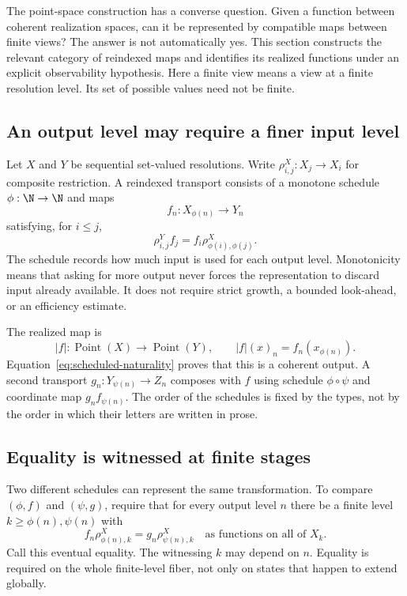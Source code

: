 \label{sec:observation}
The point-space construction has a converse question. Given a function between coherent realization spaces, can it be represented by compatible maps between finite views? The answer is not automatically yes. This section constructs the relevant category of reindexed maps and identifies its realized functions under an explicit observability hypothesis. Here a finite view means a view at a finite resolution level. Its set of possible values need not be finite.

\subsection{An output level may require a finer input level}
Let \(X\) and \(Y\) be sequential set-valued resolutions. Write \(\rho^X_{i,j}:X_j\to X_i\) for composite restriction. A reindexed transport consists of a monotone schedule \(\phi:\N\to\N\) and maps
\[
 f_n:X_{\phi(n)}\longrightarrow Y_n
\]
satisfying, for \(i\le j\),
\begin{equation}\label{eq:scheduled-naturality}
 \rho^Y_{i,j}f_j=f_i\rho^X_{\phi(i),\phi(j)}.
\end{equation}
The schedule records how much input is used for each output level. Monotonicity means that asking for more output never forces the representation to discard input already available. It does not require strict growth, a bounded look-ahead, or an efficiency estimate.

The realized map is
\[
 |f|:\operatorname{Point}(X)\to\operatorname{Point}(Y),\qquad
 |f|(x)_n=f_n(x_{\phi(n)}).
\]
Equation~\eqref{eq:scheduled-naturality} proves that this is a coherent output. A second transport \(g_n:Y_{\psi(n)}\to Z_n\) composes with \(f\) using schedule \(\phi\circ\psi\) and coordinate map \(g_n f_{\psi(n)}\). The order of the schedules is fixed by the types, not by the order in which their letters are written in prose.

\subsection{Equality is witnessed at finite stages}
Two different schedules can represent the same transformation. To compare \((\phi,f)\) and \((\psi,g)\), require that for every output level \(n\) there be a finite level \(k\ge\phi(n),\psi(n)\) with
\begin{equation}\label{eq:eventual-equality}
 f_n\rho^X_{\phi(n),k}=g_n\rho^X_{\psi(n),k}
 \quad\text{as functions on all of }X_k.
\end{equation}
Call this eventual equality. The witnessing \(k\) may depend on \(n\). Equality is required on the whole finite-level fiber, not only on states that happen to extend globally.

